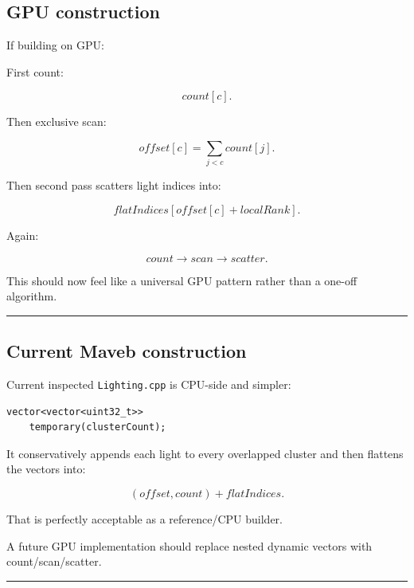 \subsection{GPU construction}\label{04-visual-computing-ii-ch040-gpu-construction}

\hypertarget{04-visual-computing-ii-ch040-gpu-construction}{}

If building on GPU:

First count:

\[
count[c].
\]

Then exclusive scan:

\[
offset[c]
=
\sum_{j<c}count[j].
\]

Then second pass scatters light indices into:

\[
flatIndices[
offset[c]+localRank
].
\]

Again:

\[
\boxed{
count
\rightarrow
scan
\rightarrow
scatter.
}
\]

This should now feel like a universal GPU pattern rather than a one-off algorithm.

\begin{center}\rule{0.5\linewidth}{0.5pt}\end{center}

\subsection{Current Maveb construction}\label{04-visual-computing-ii-ch040-current-maveb-construction}

\hypertarget{04-visual-computing-ii-ch040-current-maveb-construction}{}

Current inspected \texttt{Lighting.cpp} is CPU-side and simpler:

\begin{verbatim}
vector<vector<uint32_t>>
    temporary(clusterCount);
\end{verbatim}

It conservatively appends each light to every overlapped cluster and then flattens the vectors into:

\[
(offset,count)
+
flatIndices.
\]

That is perfectly acceptable as a reference/CPU builder.

A future GPU implementation should replace nested dynamic vectors with count/scan/scatter.

\begin{center}\rule{0.5\linewidth}{0.5pt}\end{center}

